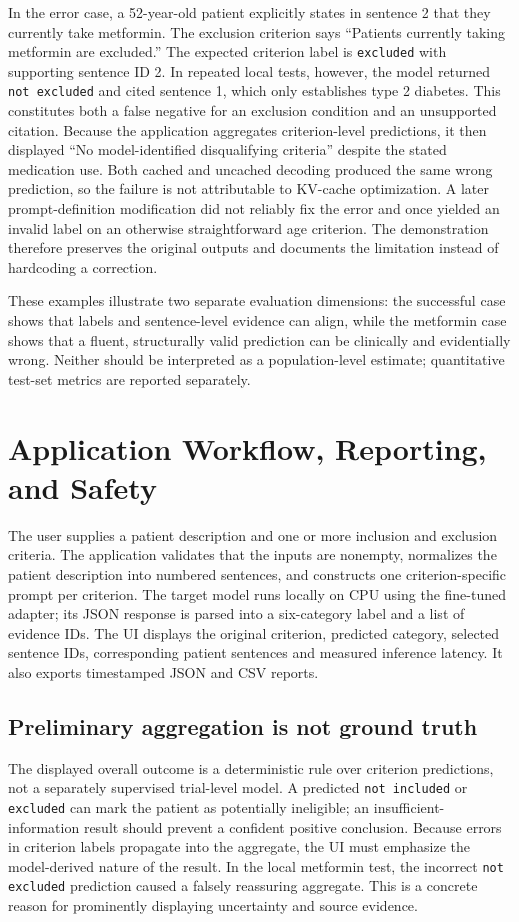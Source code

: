 \documentclass[conference]{IEEEtran}
\begin{document}
In the error case, a 52-year-old patient explicitly states in sentence 2 that they currently take metformin. The exclusion criterion says ``Patients currently taking metformin are excluded.'' The expected criterion label is \texttt{excluded} with supporting sentence ID 2. In repeated local tests, however, the model returned \texttt{not excluded} and cited sentence 1, which only establishes type 2 diabetes. This constitutes both a false negative for an exclusion condition and an unsupported citation. Because the application aggregates criterion-level predictions, it then displayed ``No model-identified disqualifying criteria'' despite the stated medication use. Both cached and uncached decoding produced the same wrong prediction, so the failure is not attributable to KV-cache optimization. A later prompt-definition modification did not reliably fix the error and once yielded an invalid label on an otherwise straightforward age criterion. The demonstration therefore preserves the original outputs and documents the limitation instead of hardcoding a correction.

These examples illustrate two separate evaluation dimensions: the successful case shows that labels and sentence-level evidence can align, while the metformin case shows that a fluent, structurally valid prediction can be clinically and evidentially wrong. Neither should be interpreted as a population-level estimate; quantitative test-set metrics are reported separately.

\section{Application Workflow, Reporting, and Safety}
The user supplies a patient description and one or more inclusion and exclusion criteria. The application validates that the inputs are nonempty, normalizes the patient description into numbered sentences, and constructs one criterion-specific prompt per criterion. The target model runs locally on CPU using the fine-tuned adapter; its JSON response is parsed into a six-category label and a list of evidence IDs. The UI displays the original criterion, predicted category, selected sentence IDs, corresponding patient sentences and measured inference latency. It also exports timestamped JSON and CSV reports.

\subsection{Preliminary aggregation is not ground truth}
The displayed overall outcome is a deterministic rule over criterion predictions, not a separately supervised trial-level model. A predicted \texttt{not included} or \texttt{excluded} can mark the patient as potentially ineligible; an insufficient-information result should prevent a confident positive conclusion. Because errors in criterion labels propagate into the aggregate, the UI must emphasize the model-derived nature of the result. In the local metformin test, the incorrect \texttt{not excluded} prediction caused a falsely reassuring aggregate. This is a concrete reason for prominently displaying uncertainty and source evidence.
\end{document}
